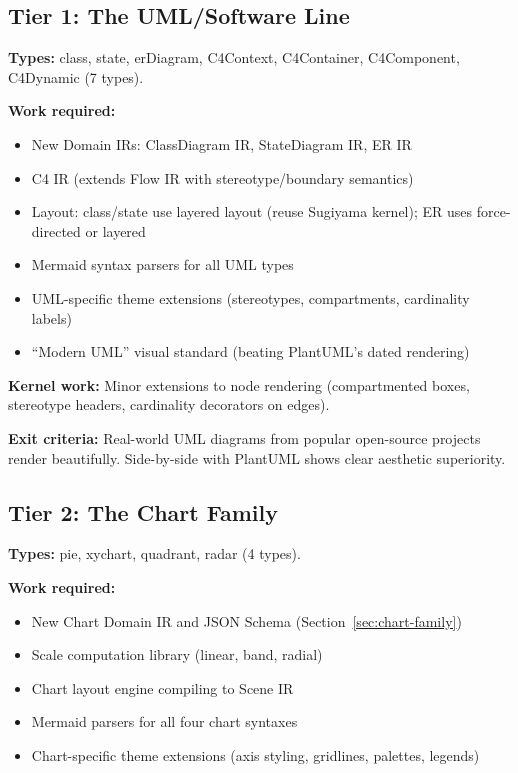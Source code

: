 \subsection{Tier 1: The UML/Software Line}

\textbf{Types:} class, state, erDiagram, C4Context, C4Container, C4Component, C4Dynamic
(7 types).

\textbf{Work required:}
\begin{itemize}
  \item New Domain IRs: ClassDiagram IR, StateDiagram IR, ER IR
  \item C4 IR (extends Flow IR with stereotype/boundary semantics)
  \item Layout: class/state use layered layout (reuse Sugiyama kernel); ER uses
        force-directed or layered
  \item Mermaid syntax parsers for all UML types
  \item UML-specific theme extensions (stereotypes, compartments, cardinality labels)
  \item ``Modern UML'' visual standard (beating PlantUML's dated rendering)
\end{itemize}

\textbf{Kernel work:} Minor extensions to node rendering (compartmented boxes, stereotype
headers, cardinality decorators on edges).

\textbf{Exit criteria:} Real-world UML diagrams from popular open-source projects render
beautifully. Side-by-side with PlantUML shows clear aesthetic superiority.

\subsection{Tier 2: The Chart Family}

\textbf{Types:} pie, xychart, quadrant, radar (4 types).

\textbf{Work required:}
\begin{itemize}
  \item New Chart Domain IR and JSON Schema (Section~\ref{sec:chart-family})
  \item Scale computation library (linear, band, radial)
  \item Chart layout engine compiling to Scene IR
  \item Mermaid parsers for all four chart syntaxes
  \item Chart-specific theme extensions (axis styling, gridlines, palettes, legends)
\end{itemize}

